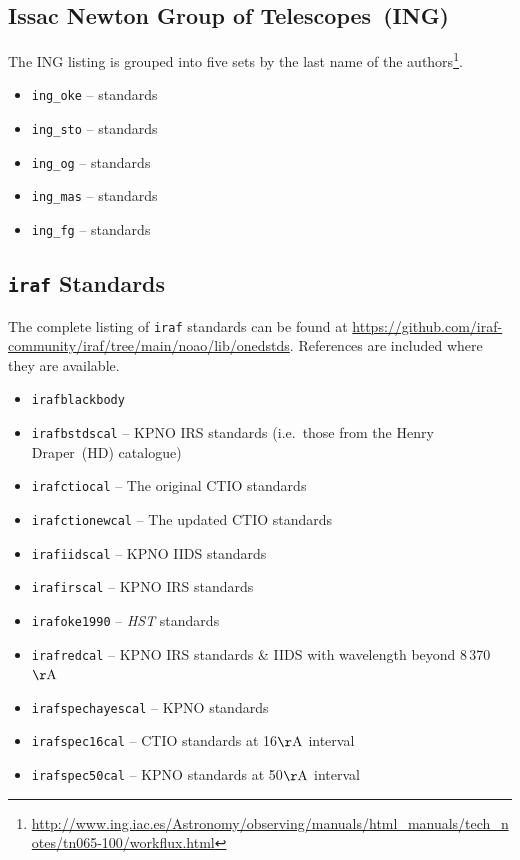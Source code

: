 \documentclass[linenumbers, twocolumn]{aastex631}
\begin{document}
\subsection*{Issac Newton Group of Telescopes~(ING)}

The ING listing is grouped into five sets by the last name of the authors\footnote{\url{http://www.ing.iac.es/Astronomy/observing/manuals/html_manuals/tech_notes/tn065-100/workflux.html}}.

\begin{itemize}
    \item \texttt{ing\_oke} -- \citet{1990AJ.....99.1621O} standards
    \item \texttt{ing\_sto} -- \citet{1977ApJ...218..767S} standards
    \item \texttt{ing\_og} -- \citet{1983ApJ...266..713O} standards
    \item \texttt{ing\_mas} -- \citet{1988ApJ...328..315M} standards
    \item \texttt{ing\_fg} -- \citet{1984PASP...96..530F} standards
\end{itemize}

\subsection*{\texttt{iraf} Standards}
The complete listing of \texttt{iraf} standards can be found at
\url{https://github.com/iraf-community/iraf/tree/main/noao/lib/onedstds}.
References are included where they are available.

\begin{itemize}
    \item \texttt{irafblackbody}
    \item \texttt{irafbstdscal} -- KPNO IRS standards (i.e.\ those from the Henry Draper~(HD) catalogue)
    \item \texttt{irafctiocal} -- The original CTIO standards \citet{1983MNRAS.204..347S, 1984MNRAS.206..241B}
    \item \texttt{irafctionewcal} -- The updated CTIO standards \citet{1992PASP..104..533H, 1994PASP..106..566H}
    \item \texttt{irafiidscal} -- KPNO IIDS standards \citet{1988ApJ...328..315M}
    \item \texttt{irafirscal} -- KPNO IRS standards \citet{1988ApJ...328..315M}
    \item \texttt{irafoke1990} -- \textit{HST} standards \citet{1990AJ.....99.1621O}
    \item \texttt{irafredcal} -- KPNO IRS standards \& IIDS \citet{1988ApJ...328..315M} with wavelength beyond 8\,370\,$\mathrm{\AA}$
    \item \texttt{irafspechayescal} -- KPNO standards \citet{1988ApJ...328..315M}
    \item \texttt{irafspec16cal} -- CTIO standards \citet{1992PASP..104..533H, 1994PASP..106..566H} at 16$\mathrm{\AA}$ interval
    \item \texttt{irafspec50cal} -- KPNO standards \citet{1988ApJ...328..315M, 1990ApJ...358..344M} at 50$\mathrm{\AA}$ interval
\end{itemize}
\end{document}
